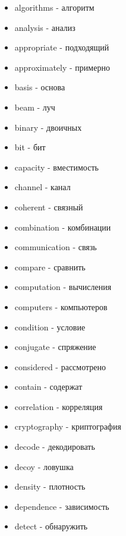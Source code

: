 \begin{multicols}{2}
	\begin{itemize}
		
		\item algorithms - алгоритм
		\item analysis - анализ
		
		\item appropriate - подходящий
		\item approximately - примерно
		
		
		\item basis - основа
		\item beam - луч
		
		\item binary - двоичных
		\item bit - бит
		
		\item capacity - вместимость
		
		\item channel - канал
		
		\item coherent - связный
		\item combination - комбинации
		
		\item communication - связь
		\item compare - сравнить
		
		\item computation - вычисления
		\item computers - компьютеров
		
		\item condition - условие
		\item conjugate - спряжение
		\item considered - рассмотрено
		\item contain - содержат
		
		\item correlation - корреляция
		
		\item cryptography - криптография
		
		\item decode - декодировать
		\item decoy - ловушка
		\item density - плотность
		
		\item dependence - зависимость
		\item detect - обнаружить
		

\end{itemize}
\end{multicols}

